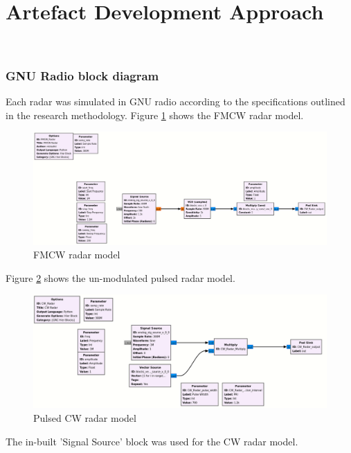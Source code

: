 \section{Artefact Development Approach}~\label{sec:approach}


\subsubsection{GNU Radio block diagram}

Each radar was simulated in GNU radio according to the specifications outlined in the research methodology.
Figure \ref{fig:FMCW} shows the \ac{FMCW} radar model.
% 
\begin{figure}[ht]
    \centering
    \includegraphics[width=1\textwidth]{Figures/FMCW.png}
    \caption{\ac{FMCW} radar model}
    \label{fig:FMCW}
\end{figure}
% 
Figure \ref{fig:pulsed_CW} shows the un-modulated pulsed radar model.
% 
\begin{figure}[ht]
    \centering
    \includegraphics[width=1\textwidth]{Figures/pulsed.png}
    \caption{Pulsed \ac{CW} radar model}
    \label{fig:pulsed_CW}
\end{figure}
% 
The in-built 'Signal Source' block was used for the \ac{CW} radar model.

